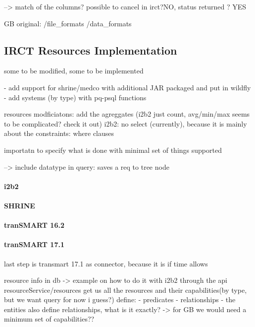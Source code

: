 --> match of the columns? possible to cancel in irct?NO, status returned ? YES

GB original: 
/file\_formats
/data\_formats


\subsection{IRCT Resources Implementation}
some to be modified, some to be implemented

- add support for shrine/medco with additional JAR packaged and put in wildfly
- add systems (by type) with pq-psql functions

resources modficiatons: add the agreggates (i2b2 just count, avg/min/max seems to be complicated? check it out)
i2b2: no select (currently), because it is mainly about the constraints: where clauses

importatn to specify what is done with minimal set of things supported

--> include datatype in query: saves a req to tree node
\paragraph{i2b2}

\paragraph{SHRINE}

\paragraph{tranSMART 16.2}

\paragraph{tranSMART 17.1}
last step is transmart 17.1 as connector, because it is if time allows


resource info in db -> example on how to do it with i2b2
through the api resourceService/resources get us all the resources and their capabilities(by type, but we want query for now i guess?)
define:
- predicates
- relationships
- the entities also define relationships, what is it exactly?
-> for GB we would need a minimum set of capabilities??

